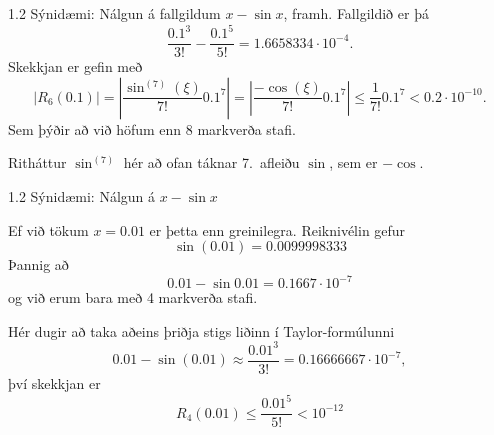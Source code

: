 \begin{frame}{1.2 Sýnidæmi: Nálgun á fallgildum $x-\sin x$, framh.}
Fallgildið er þá 
$$
\frac {0.1^3}{3!} - \frac{0.1^5}{5!} = 1.6658334 \cdot 10^{-4}.
$$
\pause
Skekkjan er gefin með
$$
    |R_6(0.1)| = \left|\frac{\sin^{(7)}(\xi)}{7!}0.1^7\right|
    = \left|\frac{-\cos(\xi)}{7!}0.1^7\right| 
    \leq \frac{1}{7!}0.1^7 < 0.2\cdot 10^{-10}.
$$
Sem þýðir að við höfum enn 8 markverða stafi.

\begin{block}{Ritháttur}
 $\sin^{(7)}$ hér að ofan táknar 7.~afleiðu $\sin$, sem er $-\cos$.
\end{block}
\end{frame}
%
\begin{frame}{1.2 Sýnidæmi: Nálgun á $x-\sin x$} 

Ef við tökum $x = 0.01$ er þetta enn greinilegra. 
Reiknivélin gefur
$$
    \sin(0.01) = 0.0099998333
$$
Þannig að 
$$
    0.01 - \sin 0.01 = 0.1667\cdot 10^{-7}
$$
og við erum bara með 4 markverða stafi.
\pause

Hér dugir að taka aðeins þriðja stigs liðinn í Taylor-formúlunni
\begin{equation*}
    0.01 - \sin (0.01) \approx \frac{0.01^3}{3!} 
    = 0.16666667 \cdot 10^{-7},
\end{equation*}
því skekkjan er
$$
R_4(0.01) \leq \frac{0.01^5}{5!} < 10^{-12}
$$
\end{frame}

